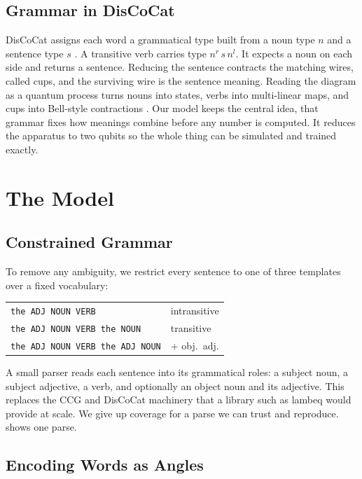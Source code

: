 \documentclass{article}
\begin{document}
\subsection{Grammar in DisCoCat}

DisCoCat assigns each word a grammatical type built from a noun type $n$ and a
sentence type $s$ \citep{coecke2010mathematical}. A transitive verb carries type
$n^r\, s\, n^l$. It expects a noun on each side and returns a sentence. Reducing
the sentence contracts the matching wires, called cups, and the surviving wire is
the sentence meaning. Reading the diagram as a quantum process turns nouns into
states, verbs into multi-linear maps, and cups into Bell-style contractions
\citep{coecke2020foundations}. Our model keeps the central idea, that grammar
fixes how meanings combine before any number is computed. It reduces the
apparatus to two qubits so the whole thing can be simulated and trained exactly.

\section{The Model}
\label{sec:model}

\subsection{Constrained Grammar}

To remove any ambiguity, we restrict every sentence to one of three templates
over a fixed vocabulary:
\begin{center}\small
\begin{tabular}{ll}
  \texttt{the ADJ NOUN VERB} & intransitive \\
  \texttt{the ADJ NOUN VERB the NOUN} & transitive \\
  \texttt{the ADJ NOUN VERB the ADJ NOUN} & + obj.\ adj.
\end{tabular}
\end{center}
A small parser reads each sentence into its grammatical roles: a subject noun, a
subject adjective, a verb, and optionally an object noun and its adjective. This
replaces the CCG and DisCoCat machinery that a library such as lambeq
\citep{kartsaklis2021lambeq} would provide at scale. We give up coverage for a
parse we can trust and reproduce.  shows one parse.

\subsection{Encoding Words as Angles}
\end{document}

